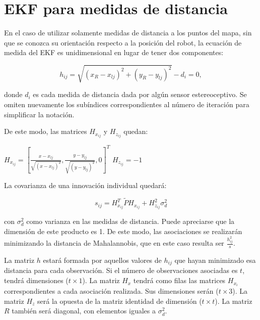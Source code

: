 
\chapter{EKF para medidas de distancia}

En el caso de utilizar solamente medidas de distancia a los puntos del mapa, sin que se conozca su orientación respecto a la posición del robot, la ecuación de medida del EKF es unidimensional en lugar de tener dos componentes:

\begin{equation}\label{eq:medida1}
    h_{ij}=\sqrt{(x_{R}-x_{lj})^{2} + (y_{R}-y_{lj})^{2}} - d_{i} = 0,
\end{equation}

donde $d_{i}$ es cada medida de distancia dada por algún sensor estereoceptivo. Se omiten nuevamente los subíndices correspondientes al número de iteración para simplificar la notación.

De este modo, las matrices $H_{x_{ij}}$ y $H_{z_{ij}}$ quedan:

\begin{center}
  $H_{x_{ij}} = [\frac{x-x_{lj}}{\sqrt{(x-x_{lj})^{2}}}, \frac{y - y_{lj}}{\sqrt{(y - y_{lj})^{2}}}, 0]^{T}$
  $H_{z_{ij}} = -1$
\end{center}

La covarianza de una innovación individual quedará:

\begin{equation}\label{eq:s}
    s_{ij}= H_{x_{ij}}^{T}\tilde{P}H_{x_{ij}} + H_{z_{ij}}^{2} \sigma_{d}^{2}
\end{equation}

con $ \sigma_{d}^{2}$ como varianza en las medidas de distancia. Puede apreciarse que la dimensión de este producto es 1. De este modo, las asociaciones se realizarán minimizando la distancia de Mahalannobis, que en este caso resulta ser $\frac{h_{ij}^{2}}{s}$.

La matriz $h$ estará formada por aquellos valores de $h_{ij}$ que hayan minimizado esa distancia para cada observación. Si el número de observaciones asociadas es $t$, tendrá dimensiones ($t\times 1$). La matriz $H_{x}$ tendrá como filas las matrices $H_{x_{i}}$ correspondientes a cada asociación realizada. Sus dimensiones serán ($t\times 3$). La matriz $H_{z}$ será la opuesta de la matriz identidad de dimensión ($t\times t$). La matriz $R$ también será diagonal, con elementos iguales a $ \sigma_{d}^{2}$.

